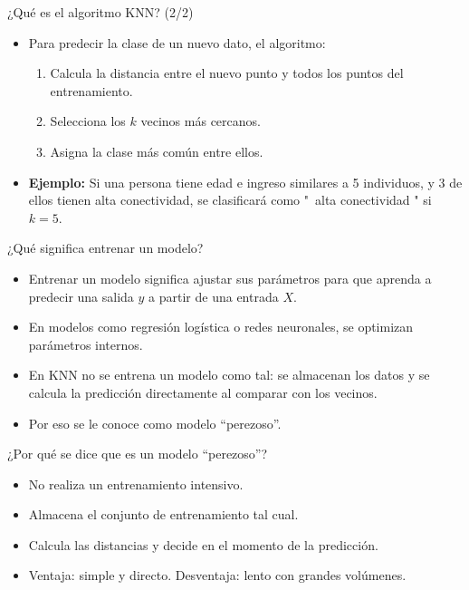 \documentclass{beamer}
\begin{document}
\begin{frame}{¿Qué es el algoritmo KNN? (2/2)}
\begin{itemize}
    \item Para predecir la clase de un nuevo dato, el algoritmo:
    \begin{enumerate}
        \item Calcula la distancia entre el nuevo punto y todos los puntos del entrenamiento.
        \item Selecciona los $k$ vecinos más cercanos.
        \item Asigna la clase más común entre ellos.
    \end{enumerate}
    \item \textbf{Ejemplo:} Si una persona tiene edad e ingreso similares a 5 individuos, y 3 de ellos tienen alta conectividad, se clasificará como "\ alta conectividad " si $k=5$.
\end{itemize}
\end{frame}


\begin{frame}{¿Qué significa entrenar un modelo?}
\begin{itemize}
    \item Entrenar un modelo significa ajustar sus parámetros para que aprenda a predecir una salida $y$ a partir de una entrada $X$.
    \item En modelos como regresión logística o redes neuronales, se optimizan parámetros internos.
    \item En KNN no se entrena un modelo como tal: se almacenan los datos y se calcula la predicción directamente al comparar con los vecinos.
    \item Por eso se le conoce como modelo “perezoso”.
\end{itemize}
\end{frame}

\begin{frame}{¿Por qué se dice que es un modelo “perezoso”?}
\begin{itemize}
    \item No realiza un entrenamiento intensivo.
    \item Almacena el conjunto de entrenamiento tal cual.
    \item Calcula las distancias y decide en el momento de la predicción.
    \item Ventaja: simple y directo. Desventaja: lento con grandes volúmenes.
\end{itemize}
\end{frame}
\end{document}

